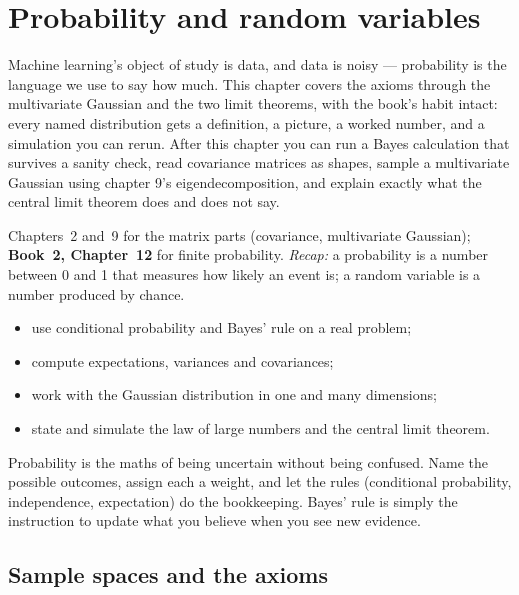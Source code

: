 \chapter{Probability and random variables}\label{ch:prob}

Machine learning's object of study is data, and data is noisy ---
probability is the language we use to say how much. This chapter covers
the axioms through the multivariate Gaussian and the two limit theorems,
with the book's habit intact: every named distribution gets a definition,
a picture, a worked number, and a simulation you can rerun. After this
chapter you can run a Bayes calculation that survives a sanity check,
read covariance matrices as shapes, sample a multivariate Gaussian using
chapter 9's eigendecomposition, and explain exactly what the central
limit theorem does and does not say.

\begin{rulebox}
Chapters~2 and~9 for the matrix parts (covariance, multivariate Gaussian); \textbf{Book~2, Chapter~12} for finite probability. \emph{Recap:} a probability is a number between 0 and 1 that measures how likely an event is; a random variable is a number produced by chance.
\end{rulebox}
\begin{wins}
\begin{itemize}
\item use conditional probability and Bayes' rule on a real problem;
\item compute expectations, variances and covariances;
\item work with the Gaussian distribution in one and many dimensions;
\item state and simulate the law of large numbers and the central limit theorem.
\end{itemize}
\end{wins}
\begin{principle}
Probability is the maths of being uncertain without being confused. Name the possible outcomes, assign each a weight, and let the rules (conditional probability, independence, expectation) do the bookkeeping. Bayes' rule is simply the instruction to update what you believe when you see new evidence.
\end{principle}

\section{Sample spaces and the axioms}\label{sec:prob-axioms}

